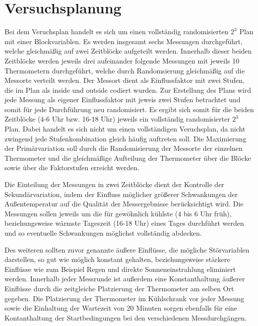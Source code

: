 \documentclass[ ngerman, fontsize= 12pt, paper=a4, headings=big, titlepage=true]{article}
\begin{document}
	\section{Versuchsplanung}
	Bei dem Veruchsplan handelt es sich um einen vollständig randomisierten $2^3$ Plan mit einer Blockvariablen. Es werden insgesamt sechs Messungen durchgeführt, welche gleichmäßig auf zwei Zeitblöcke aufgeteilt werden. Innerhalb dieser beiden Zeitblöcke werden jeweils drei aufeinander folgende Messungen mit jeweils 10 Thermometern durchgeführt, welche durch Randomsierung gleichmäßig auf die Messorte verteilt werden. Der Messort dient als Einflussfaktor mit zwei Stufen, die im Plan als inside und outside codiert wurden. Zur Erstellung des Plans wird jede Messung als eigener Einflussfaktor mit jeweis zwei Stufen betrachtet und somit für jede Durchführung neu randomisiert. Es ergibt sich somit für die beiden Zeitblöcke (4-6 Uhr bzw. 16-18 Uhr) jeweils ein vollständig randomisierter $2^3$ Plan. Dabei handelt es sich nicht um einen vollständigen Veruchsplan, da nicht zwingend jede Stufenkombination gleich häufig auftreten soll. Die Maximierung der Primärvariation soll durch die Randomisierung der Messorte der einzelnen Thermometer und die gleichmäßige Aufteilung der Thermometer über die Blöcke sowie über die Faktorstufen erreicht werden. 

\noindent Die Einteilung der Messungen in zwei Zeitblöcke dient der Kontrolle der Sekundärvariation, indem der Einfluss möglicher größerer Schwankungen der Außentemperatur auf die Qualität der Messergebnisse berücksichtigt wird. Die Messungen sollen jeweils um die für gewöhnlich kühlste (4 bis 6 Uhr früh), beziehungsweise wärmste Tageszeit (16-18 Uhr) eines Tages durchführt werden und so eventuelle Schwankungen möglichst vollständig abdecken.

\noindent Des weiteren sollten zuvor genannte äußere Einflüsse, die mögliche Störvariablen darstellen, so gut wie möglich konstant gehalten, beziehungsweise stärkere Einflüsse wie zum Beispiel Regen und direkte Sonneneinstrahlung eliminiert werden. Innerhalb jeder Messrunde ist außerdem eine Konstanthaltung äußerer Einflüsse durch die zeitgleiche Platzierung der Thermometer am selben Ort gegeben. Die Platzierung der Thermometer im Kühlschrank vor jeder Messung sowie die Einhaltung der Wartezeit von 20 Minuten sorgen ebenfalls für eine Kontanthaltung der Startbedingungen bei den verschiedenen Messdurchgängen.
\end{document}
